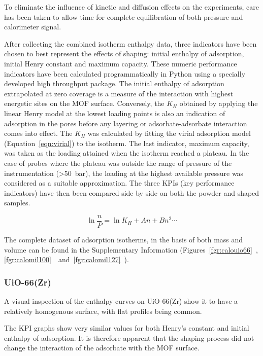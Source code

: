 To eliminate the influence of kinetic and diffusion effects on the experiments,
care has been taken to allow time for complete equilibration of both pressure
and calorimeter signal.

After collecting the combined isotherm enthalpy data, three indicators have been chosen
to best represent the effects of shaping: initial enthalpy of adsorption, initial 
Henry constant and maximum capacity. These numeric performance indicators have been
calculated programmatically in Python using a specially developed high throughput
package.
The initial enthalpy of adsorption extrapolated at zero coverage is a measure of the 
interaction with highest energetic sites on the MOF surface. Conversely, the 
\(K_H\) obtained by applying the linear Henry model at the lowest loading points
is also an indication of adsorption in the pores before any 
layering or adsorbate-adsorbate interaction comes into effect. The \(K_H\) was 
calculated by fitting the virial adsorption model (Equation~\ref{eqn:virial})
to the isotherm.
The last indicator, maximum capacity, was taken as the loading attained when 
the isotherm reached a plateau. In the case of probes where the plateau was outside 
the range of pressure of the instrumentation (>\SI{50}{\bar}), the loading at the 
highest available pressure was considered as a suitable approximation.
The three KPIs (key performance indicators) have then been compared side by 
side on both the powder and shaped samples. 

\begin{equation}
    \label{eqn:virial}
    \ln{\frac{n}{P}} = \ln{K_H} + An + Bn^2 \cdots
\end{equation}

The complete dataset of adsorption isotherms, in the basis of both mass and volume 
can be found in the Supplementary Information (Figures~\ref*{fgr:calouio66}~,
\ref*{fgr:calomil100}~~and~\ref*{fgr:calomil127}~).

\subsubsection{UiO-66(Zr)}

A visual inspection of the enthalpy curves on UiO-66(Zr) show it to have a 
relatively homogenous surface, with flat profiles being common.

The KPI graphs show very similar values for both Henry's constant and initial 
enthalpy of adsorption. It is therefore apparent that the shaping process did not 
change the interaction of the adsorbate with the MOF surface.


